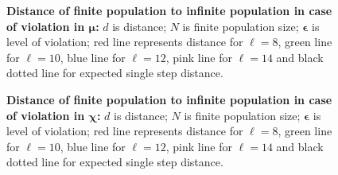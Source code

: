 \begin{figure}[h]
\begin{center}
\hspace{-3em}%
\caption{\textbf{Distance of finite population to infinite population in case of violation in $\bm{\mu}$:}  
  $d$ is distance; $N$ is finite population size; $\bm{\epsilon}$ is level of violation;
  red line represents distance for $\ell = 8$, green line for $\ell = 10$, blue line for $\ell = 12$, pink line for $\ell = 14$ 
  and black dotted line for expected single step distance.}
\label{vio_mu_dist}
\end{center}
\end{figure}
\begin{figure}[h]
\begin{center}
\hspace{-3em}%
\caption{\textbf{Distance of finite population to infinite population in case of violation in $\bm{\chi}$:}  
  $d$ is distance; $N$ is finite population size; $\bm{\epsilon}$ is level of violation; 
  red line represents distance for $\ell = 8$, green line for $\ell = 10$, blue line for $\ell = 12$, pink line for $\ell = 14$ 
  and black dotted line for expected single step distance.}
\label{vio_chi_dist}
\end{center}
\end{figure}

